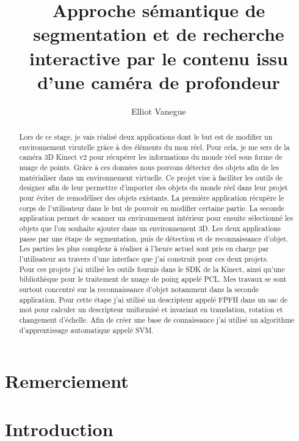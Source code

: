 \documentclass[a4paper,11pt]{article}
\title{Approche sémantique de segmentation et de recherche interactive par le contenu issu d’une caméra de profondeur}
\author{Elliot Vanegue}
\begin{document}
\maketitle
\newpage

\section*{Remerciement}
\newpage

\begin{abstract}
Lors de ce stage, je vais réalisé deux applications dont le but est de modifier un environnement
virutelle grâce à des éléments du mon réel. Pour cela, je me sers de la caméra 3D Kinect v2
pour récupérer les informations du monde réel sous forme de nuage de points. Grâce à ces données
nous pouvons détecter des objets afin de les matérialiser dans un environnement virtuelle.
Ce projet vise à faciliter les outils de designer afin de leur permettre d'importer des objets
du monde réel dans leur projet pour éviter de remodéliser des objets existants. La première 
application récupère le corps de l'utilisateur dans le but de pouvoir en modifier certaine
partie. La seconde application permet de scanner un environnement intérieur pour ensuite 
sélectionné les objets que l'on souhaite ajouter dans un environnement 3D. Les deux applications
passe par une étape de segmentation, puis de détection et de reconnaissance d'objet. Les parties
les plus complexe à réaliser à l'heure actuel sont pris en charge par l'utilisateur au travers 
d'une interface que j'ai construit pour ces deux projets.\\

Pour ces projets j'ai utilisé les outils fournis dans le SDK de la Kinect, ainsi qu'une bibliothèque
pour le traitement de nuage de poing appelé PCL. Mes travaux se sont surtout concentré sur la reconnaissance
d'objet notamment dans la seconde application. Pour cette étape j'ai utilisé un descripteur appelé FPFH dans 
un sac de mot pour calculer un descripteur uniformisé et invariant en translation, rotation et changement
d'échelle. Afin de créer une base de connaissance j'ai utilisé un algorithme d'apprentissage automatique
appelé SVM.
\end{abstract}
\newpage

\tableofcontents
\newpage

\section{Introduction}

\end{document}
